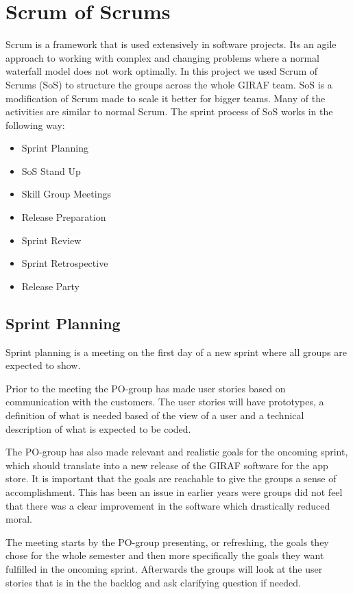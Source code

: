 \section{Scrum of Scrums}
Scrum is a framework that is used extensively in software projects.
Its an agile approach to working with complex and changing problems where a normal waterfall model does not work optimally.
In this project we used Scrum of Scrums (SoS) to structure the groups across the whole GIRAF team.
SoS is a modification of Scrum made to scale it better for bigger teams.
Many of the activities are similar to normal Scrum.
The sprint process of SoS works in the following way:

\begin{itemize}
    \item Sprint Planning
    \item SoS Stand Up
    \item Skill Group Meetings
    \item Release Preparation
    \item Sprint Review
    \item Sprint Retrospective
    \item Release Party
\end{itemize}

\subsection{Sprint Planning}
Sprint planning is a meeting on the first day of a new sprint where all groups are expected to show.

Prior to the meeting the PO-group has made user stories based on communication with the customers.
The user stories will have prototypes, a definition of what is needed based of the view of a user and a technical description of what is expected to be coded.

The PO-group has also made relevant and realistic goals for the oncoming sprint, which should translate into a new release of the GIRAF software for the app store.
It is important that the goals are reachable to give the groups a sense of accomplishment.
This has been an issue in earlier years were groups did not feel that there was a clear improvement in the software which drastically reduced moral.

The meeting starts by the PO-group presenting, or refreshing, the goals they chose for the whole semester and then more specifically the goals they want fulfilled in the oncoming sprint.
Afterwards the groups will look at the user stories that is in the the backlog and ask clarifying question if needed.

